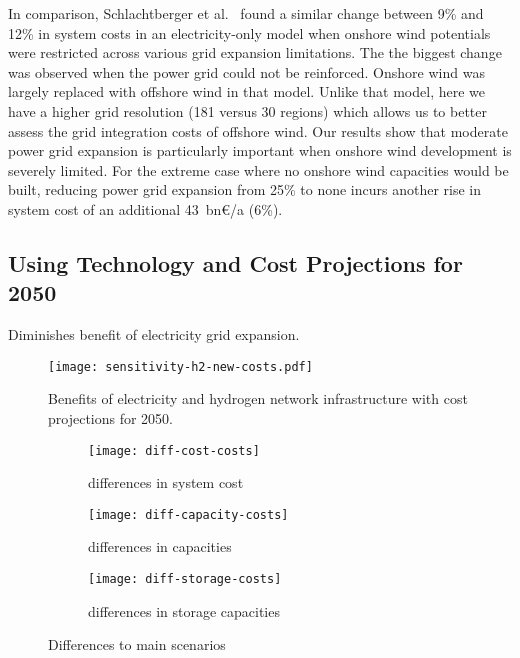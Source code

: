 In comparison, Schlachtberger et al.~ found
a similar change between 9\% and 12\% in system costs in an electricity-only
model when onshore wind potentials were restricted across various grid expansion
limitations. The the biggest change was observed when the power grid could not
be reinforced. Onshore wind was largely replaced with offshore wind in that
model. Unlike that model, here we have a higher grid resolution (181 versus 30
regions) which allows us to better assess the grid integration costs of offshore
wind. Our results show that moderate power grid expansion is particularly
important when onshore wind development is severely limited. For the extreme
case where no onshore wind capacities would be built, reducing power grid
expansion from 25\% to none incurs another rise in system cost of an additional
43~bn\euro/a (6\%).


\subsection{Using Technology and Cost Projections for 2050}
\label{sec:si:sensitivity-costs}

Diminishes benefit of electricity grid expansion.

\begin{figure}
    \centering
    \texttt{[image: sensitivity-h2-new-costs.pdf]}
    \caption{Benefits of electricity and hydrogen network infrastructure with cost projections for 2050.}
    \label{fig:sensitivity-costs}
\end{figure}

\begin{figure}
    \centering
    \begin{subfigure}[t]{\textwidth}
        \centering
        \caption{differences in system cost}
        \texttt{[image: diff-cost-costs]}
        \label{fig:sensitivity-costs-cost}
    \end{subfigure}
    \begin{subfigure}[t]{\textwidth}
        \centering
        \caption{differences in capacities}
        \texttt{[image: diff-capacity-costs]}
        \label{fig:sensitivity-costs-cap}
    \end{subfigure}
    \begin{subfigure}[t]{\textwidth}
        \centering
        \caption{differences in storage capacities}
        \texttt{[image: diff-storage-costs]}
        \label{fig:sensitivity-costs-sto}
    \end{subfigure}
    \caption{Differences to main scenarios}
    \label{fig:sensitivity-costs-diff}
\end{figure}

